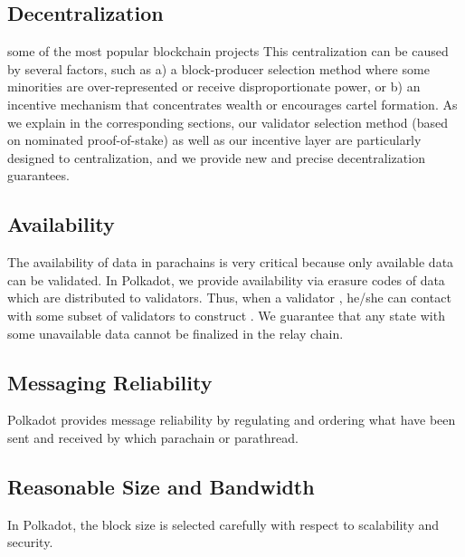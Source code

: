 \subsection{Decentralization}

 some of the most popular blockchain projects 
This centralization can be caused by several factors, such as
a) a block-producer selection method where some minorities are over-represented or receive disproportionate power, or
b) an incentive mechanism that concentrates wealth or encourages cartel formation.
As we explain in the corresponding sections, our validator selection method (based on nominated proof-of-stake)
as well as our incentive layer are particularly designed to   centralization,
and we provide new and precise decentralization guarantees.


\subsection{Availability}
The availability of data in parachains is very critical because only available data can be validated.  In Polkadot, we provide availability via erasure codes of data which are distributed to validators. Thus, when a validator , he/she can contact with some subset of validators to construct . We guarantee that any state with some unavailable data cannot be finalized in the relay chain.

\subsection{Messaging Reliability} Polkadot provides message reliability by regulating and ordering what  have been sent and received by which parachain or parathread.

\subsection{Reasonable Size and Bandwidth} In Polkadot, the block size is selected carefully with respect to scalability and security. 



